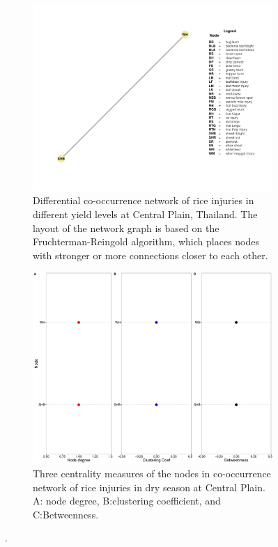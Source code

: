  \begin{figure}
    \centering
    \begin{subfigure}[b]{1\textwidth}
        \includegraphics[width = 1\textwidth]{figures/difyieldTM.pdf}
        \caption{Differential co-occurrence network of rice injuries in different yield levels at Central Plain, Thailand. The layout of the network graph is based on the Fruchterman-Reingold algorithm, which places nodes with stronger or more connections closer to each other.}
        \label{fig:difyield_WJ}
    \end{subfigure}
    \begin{subfigure}[b]{1\textwidth}
        \includegraphics[width = 1\textwidth]{figures/yield_dif_nodepropTamil_Nadu.pdf}
        \caption{Three centrality measures of the nodes in co-occurrence network of rice injuries in dry season at Central Plain. A: node degree, B:clustering coefficient, and C:Betweenness.}
        \label{fig:nodepropdifyield_WJ}
    \end{subfigure}
    \caption{.}
    \label{fig:nodeprop_yielddif_WJ}
\end{figure}

